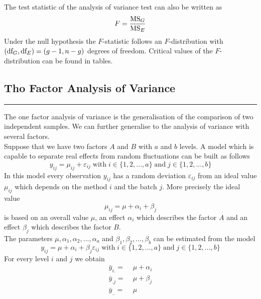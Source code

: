 The test statistic of the analysis of variance test can also be written as
\begin{equation}
  F = \frac{\textup{MS}_G}{\textup{MS}_E}
\end{equation}
Under the null hypothesis the $F$-statistic follows an $F$-distribution with $(\textup{df}_G, \textup{df}_E) = (g - 1, n - g)$ degrees of freedom. Critical values of the $F$-distribution can be found in tables.

\subsection{Tho Factor Analysis of Variance}
\noindent\rule[\linienAbstand]{\linewidth}{\linienDicke}
The one factor analysis of variance is the generalisation of the comparison of two independent samples. We can further generalise to the analysis of variance with several factors.\\
Suppose that we have two factors $A$ and $B$ with $a$ and $b$ levels. A model which is capable to separate real effects from random fluctuations can be built as follows
\begin{equation}
  y_{ij} = \mu_{ij} + \varepsilon_{ij} \;\text{with}\; i \in \{1, 2, ..., a\} \;\text{and}\; j \in \{1, 2, ...,b\}
\end{equation}
In this model every observation $y_{ij}$ has a random deviation $\varepsilon_{ij}$ from an ideal value $\mu_{ij}$ which depends on the method $i$ and the batch $j$. More precisely the ideal value
\begin{equation}
  \mu_{ij} = \mu + \alpha_i + \beta_j
\end{equation}
is based on an overall value $\mu$, an effect $\alpha_i$ which describes the factor $A$ and an effect $\beta_j$ which describes the factor $B$.\\

The parameters $\mu, \alpha_1, \alpha_2, . . . , \alpha_a$ and $\beta_1, \beta_2, . . . , \beta_b$ can be estimated from the model
\begin{equation}
  y_{ij} = \mu + \alpha_i + \beta_j \varepsilon_{ij} \;\text{with}\; i \in \{1, 2, ..., a\} \;\text{and}\; j \in \{1, 2, ...,b\}
\end{equation}
For every level $i$ and $j$ we obtain
\begin{equation}
  \begin{split}
    \bar{y}_{i.} =& \; \mu + \alpha_i\\
    \bar{y}_{.j} =& \; \mu + \beta_j\\
    \bar{y}_{..} =& \; \mu
      \end{split}
\end{equation}

